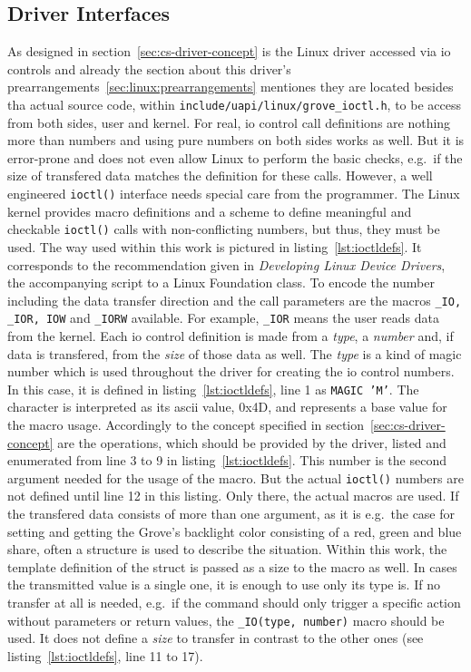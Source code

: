 \subsection{Driver Interfaces}

As designed in section~\ref{sec:cs-driver-concept} is the Linux driver accessed via \ac{io} controls and already the section about this driver's prearrangements~\ref{sec:linux:prearrangements} mentiones they are located besides tha actual source code, within \texttt{include/uapi/linux/grove\_ioctl.h}, to be access from both sides, user and kernel.
For real, \ac{io} control call definitions are nothing more than numbers and using pure numbers on both sides works as well.
But it is error-prone and does not even allow Linux to perform the basic checks, e.g.\ if the size of transfered data matches the definition for these calls.
However, a well engineered \texttt{ioctl()} interface needs special care from the programmer.
The Linux kernel provides macro definitions and a scheme to define meaningful and checkable \texttt{ioctl()} calls with non-conflicting numbers, but thus, they must be used.
The way used within this work is pictured in listing~\ref{lst:ioctldefs}.
It corresponds to the recommendation given in \textit{Developing Linux Device Drivers}\cite{lfd430}, the accompanying script to a Linux Foundation class.
To encode the number including the data transfer direction and the call parameters are the macros \texttt{_IO, _IOR, IOW} and \texttt{_IORW} available.
For example, \texttt{_IOR} means the user reads data from the kernel.
Each \ac{io} control definition is made from a \textit{type}, a \textit{number} and, if data is transfered, from the \textit{size} of those data as well. 
The \textit{type} is a kind of magic number which is used throughout the driver for creating the \ac{io} control numbers.
In this case, it is defined in listing~\ref{lst:ioctldefs}, line 1 as \texttt{MAGIC 'M'}.
The character is interpreted as its \ac{ascii} value, 0x4D, and represents a base value for the macro usage.
Accordingly to the concept specified in section~\ref{sec:cs-driver-concept} are the operations, which should be provided by the driver, listed and enumerated from line 3 to 9 in listing~\ref{lst:ioctldefs}.
This number is the second argument needed for the usage of the macro.
But the actual \texttt{ioctl()} numbers are not defined until line 12 in this listing.
Only there, the actual macros are used.
If the transfered data consists of more than one argument, as it is e.g.\ the case for setting and getting the Grove's backlight color consisting of a red, green and blue share, often a structure is used to describe the situation.
Within this work, the template definition of the struct is passed as a size to the macro as well.
In cases the transmitted value is a single one, it is enough to use only its type is.
If no transfer at all is needed, e.g.\ if the command should only trigger a specific action without parameters or return values, the \texttt{_IO(type, number)} macro should be used.
It does not define a \textit{size} to transfer in contrast to the other ones (see listing~\ref{lst:ioctldefs}, line 11 to 17).

